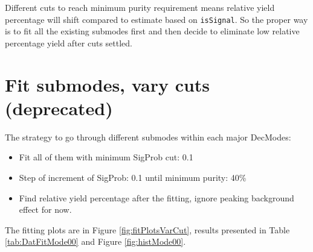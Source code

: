\documentclass{article}
\begin{document}
Different cuts to reach minimum purity requirement means relative yield percentage will shift compared to estimate based on \verb+isSignal+. So the proper way is to fit all the existing submodes first and then decide to eliminate low relative percentage yield after cuts settled.  
\newpage
\section{Fit submodes, vary cuts (deprecated)}
The strategy to go through different submodes within each major DecModes:
\begin{itemize}
\item Fit all of them with minimum SigProb cut: 0.1
\item Step of increment of SigProb: 0.1 until minimum purity: 40\%
\item Find relative yield percentage after the fitting, ignore peaking background effect for now.
\end{itemize}

The fitting plots are in Figure \ref{fig:fitPlotsVarCut}, results presented in Table \ref{tab:DatFitMode00} and Figure \ref{fig:histMode00}.
\end{document}
